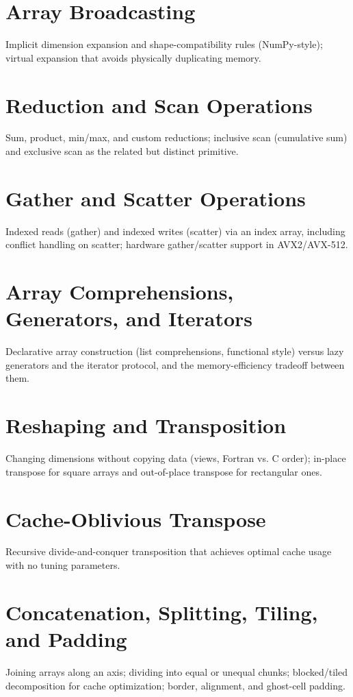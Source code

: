 \chapter{Array Broadcasting}
Implicit dimension expansion and shape-compatibility rules (NumPy-style); virtual expansion that avoids physically duplicating memory.

\chapter{Reduction and Scan Operations}
Sum, product, min/max, and custom reductions; inclusive scan (cumulative sum) and exclusive scan as the related but distinct primitive.

\chapter{Gather and Scatter Operations}
Indexed reads (gather) and indexed writes (scatter) via an index array, including conflict handling on scatter; hardware gather/scatter support in AVX2/AVX-512.

\chapter{Array Comprehensions, Generators, and Iterators}
Declarative array construction (list comprehensions, functional style) versus lazy generators and the iterator protocol, and the memory-efficiency tradeoff between them.

\chapter{Reshaping and Transposition}
Changing dimensions without copying data (views, Fortran vs. C order); in-place transpose for square arrays and out-of-place transpose for rectangular ones.

\chapter{Cache-Oblivious Transpose}
Recursive divide-and-conquer transposition that achieves optimal cache usage with no tuning parameters.

\chapter{Concatenation, Splitting, Tiling, and Padding}
Joining arrays along an axis; dividing into equal or unequal chunks; blocked/tiled decomposition for cache optimization; border, alignment, and ghost-cell padding.

